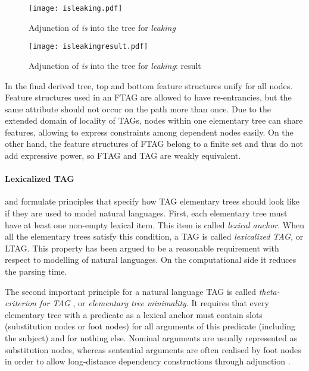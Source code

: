 \begin{figure}
	\centering
    \texttt{[image: isleaking.pdf]}
    \caption{Adjunction of \textit{is} into the tree for \textit{leaking}     \label{fig:isleaking}}
\end{figure}

\begin{figure}
	\centering
    \texttt{[image: isleakingresult.pdf]}
    \caption{Adjunction of \textit{is} into the tree for \textit{leaking}: result \label{fig:isleakingresult}}
\end{figure}

In the final derived tree, top and bottom feature structures unify for all nodes. Feature structures used in an FTAG are allowed to have re-entrancies, but the same attribute should not occur on the path more than once. Due to the extended domain of locality of TAGs, nodes within one elementary tree can share features, allowing to express constraints among dependent nodes easily. On the other hand, the feature structures of FTAG belong to a finite set and thus do not add expressive power, so FTAG and TAG are weakly equivalent.


\paragraph*{Lexicalized TAG} \citet{Abeille:02} and \cite{Frank:02} formulate principles that specify how TAG elementary trees should look like if they are used to model natural languages. First, each elementary tree must have at least one non-empty lexical item. This item is called \textit{lexical anchor}. When all the elementary trees satisfy this condition, a TAG is called \textit{lexicalized TAG,} or LTAG. This property has been argued to be a reasonable requirement with respect to modelling of natural languages. On the computational side it reduces the parsing time. 

The second important principle for a natural language TAG is called \textit{theta-criterion for TAG} \citep{Frank:92}, or \textit{elementary tree minimality}. It requires that every elementary tree with a predicate as a lexical anchor must contain slots (substitution nodes or foot nodes) for all arguments of this predicate (including the subject) and for nothing else. Nominal arguments are usually represented as substitution nodes, whereas sentential arguments are often realised by foot nodes in order to allow long-distance dependency constructions through adjunction  \citep{Kroch:89, Frank:02}.

